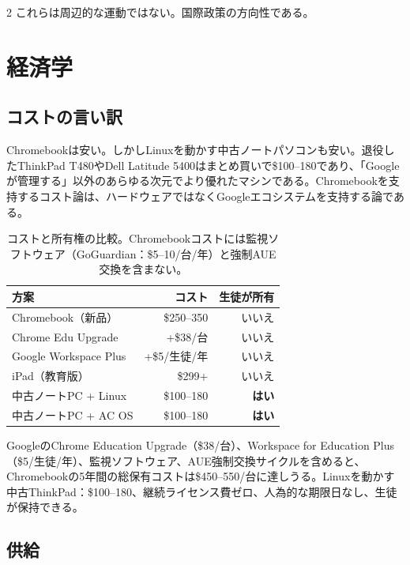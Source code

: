 \documentclass[11pt, a4paper]{article}
\begin{document}
\begin{multicols}{2}
これらは周辺的な運動ではない。国際政策の方向性である。


\section{経済学}

\subsection{コストの言い訳}

Chromebookは安い。しかしLinuxを動かす中古ノートパソコンも安い。退役したThinkPad T480やDell Latitude 5400はまとめ買いで\$100--180であり、「Googleが管理する」以外のあらゆる次元でより優れたマシンである。Chromebookを支持するコスト論は、ハードウェアではなくGoogleエコシステムを支持する論である。

\begin{table}[H]
\small
\centering
\begin{tabular}{lrr}
\toprule
\textbf{方案} & \textbf{コスト} & \textbf{生徒が所有} \\
\midrule
Chromebook（新品） & \$250--350 & いいえ \\
Chrome Edu Upgrade & +\$38/台 & いいえ \\
Google Workspace Plus & +\$5/生徒/年 & いいえ \\
iPad（教育版） & \$299+ & いいえ \\
\midrule
中古ノートPC + Linux & \$100--180 & \textbf{はい} \\
中古ノートPC + AC OS & \$100--180 & \textbf{はい} \\
\bottomrule
\end{tabular}
\caption{コストと所有権の比較。Chromebookコストには監視ソフトウェア（GoGuardian：\$5--10/台/年）と強制AUE交換を含まない。}
\label{tab:cost}
\end{table}

GoogleのChrome Education Upgrade（\$38/台）、Workspace for Education Plus（\$5/生徒/年）、監視ソフトウェア、AUE強制交換サイクルを含めると、Chromebookの5年間の総保有コストは\$450--550/台に達しうる。Linuxを動かす中古ThinkPad：\$100--180、継続ライセンス費ゼロ、人為的な期限日なし、生徒が保持できる。

\subsection{供給}


\end{multicols}
\end{document}
